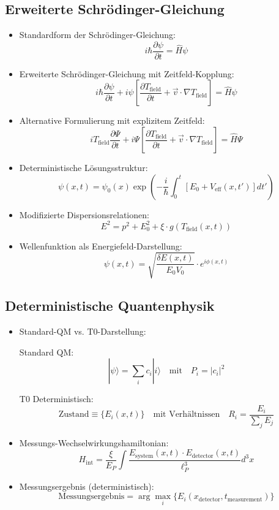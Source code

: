 \documentclass[12pt,a4paper]{article}
\begin{document}
	\subsection{Erweiterte Schr\"{o}dinger-Gleichung}
	\begin{itemize}
		\item Standardform der Schr\"{o}dinger-Gleichung:
		$$i\hbar \frac{\partial \psi}{\partial t} = \hat{H}\psi$$
		
		\item Erweiterte Schr\"{o}dinger-Gleichung mit Zeitfeld-Kopplung:
		$$\boxed{i\hbar \frac{\partial\psi}{\partial t} + i\psi\left[\frac{\partial T_{\text{field}}}{\partial t} + \vec{v} \cdot \nabla T_{\text{field}}\right] = \hat{H}\psi}$$
		
		\item Alternative Formulierung mit explizitem Zeitfeld:
		$$\boxed{i T_{\text{field}} \frac{\partial\Psi}{\partial t} + i\Psi\left[\frac{\partial T_{\text{field}}}{\partial t} + \vec{v} \cdot \nabla T_{\text{field}}\right] = \hat{H}\Psi}$$
		
		\item Deterministische L\"{o}sungsstruktur:
		$$\psi(x,t) = \psi_0(x) \exp\left(-\frac{i}{\hbar} \int_0^t \left[E_0 + V_{\text{eff}}(x,t')\right] dt'\right)$$
		
		\item Modifizierte Dispersionsrelationen:
		$$E^2 = p^2 + E_0^2 + \xi \cdot g(T_{\text{field}}(x,t))$$
		
		\item Wellenfunktion als Energiefeld-Darstellung:
		$$\psi(x,t) = \sqrt{\frac{\delta E(x,t)}{E_0 V_0}} \cdot e^{i\phi(x,t)}$$
	\end{itemize}
	
	\subsection{Deterministische Quantenphysik}
	\begin{itemize}
		\item Standard-QM vs. T0-Darstellung:
		
		Standard QM: $$|\psi\rangle = \sum_i c_i |i\rangle \quad \text{mit} \quad P_i = |c_i|^2$$
		
		T0 Deterministisch: $$\text{Zustand} \equiv \{E_i(x,t)\} \quad \text{mit Verh\"{a}ltnissen} \quad R_i = \frac{E_i}{\sum_j E_j}$$
		
		\item Messungs-Wechselwirkungshamiltonian:
		$$H_{\text{int}} = \frac{\xi}{E_P} \int \frac{E_{\text{system}}(x,t) \cdot E_{\text{detector}}(x,t)}{\ell_P^3} d^3x$$
		
		\item Messungsergebnis (deterministisch):
		$$\text{Messungsergebnis} = \arg\max_i\{E_i(x_{\text{detector}}, t_{\text{measurement}})\}$$
	\end{itemize}
	
\end{document}
